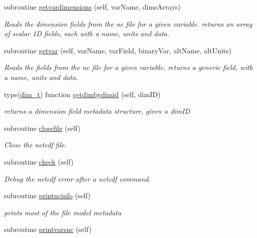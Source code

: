 \begin{DoxyCompactItemize}
subroutine \mbox{\hyperlink{namespacenetcdfparser__mod_a0aea819b8a474ce2f4840d0bc44e95ec}{getvardimensions}} (self, var\+Name, dims\+Arrays)
\begin{DoxyCompactList}\small\item\em Reads the dimension fields from the nc file for a given variable. returns an array of scalar 1D fields, each with a name, units and data. \end{DoxyCompactList}\item 
subroutine \mbox{\hyperlink{namespacenetcdfparser__mod_aba877869db6bea7262d659133253cff7}{getvar}} (self, var\+Name, var\+Field, binary\+Var, alt\+Name, alt\+Units)
\begin{DoxyCompactList}\small\item\em Reads the fields from the nc file for a given variable. returns a generic field, with a name, units and data. \end{DoxyCompactList}\item 
type(\mbox{\hyperlink{structnetcdfparser__mod_1_1dim__t}{dim\+\_\+t}}) function \mbox{\hyperlink{namespacenetcdfparser__mod_a5fcd4b7fb27dbc9befd0a6fcfb9929a1}{getdimbydimid}} (self, dim\+ID)
\begin{DoxyCompactList}\small\item\em returns a dimension field metadata structure, given a dim\+ID \end{DoxyCompactList}\item 
subroutine \mbox{\hyperlink{namespacenetcdfparser__mod_a518627511cac4bf3dbc338bf3bfd5e24}{closefile}} (self)
\begin{DoxyCompactList}\small\item\em Close the netcdf file. \end{DoxyCompactList}\item 
subroutine \mbox{\hyperlink{namespacenetcdfparser__mod_ae1a034f6540ac7a1ce7d0e3831bb2f03}{check}} (self)
\begin{DoxyCompactList}\small\item\em Debug the netcdf error after a netcdf command. \end{DoxyCompactList}\item 
subroutine \mbox{\hyperlink{namespacenetcdfparser__mod_aeb48d33c014bae21b2fceaaa70cbdc67}{printncinfo}} (self)
\begin{DoxyCompactList}\small\item\em prints most of the file model metadata \end{DoxyCompactList}\item 
subroutine \mbox{\hyperlink{namespacenetcdfparser__mod_a6b57fa47d7bd796c75483216a51e5e04}{printvarsnc}} (self)

\end{DoxyCompactItemize}
